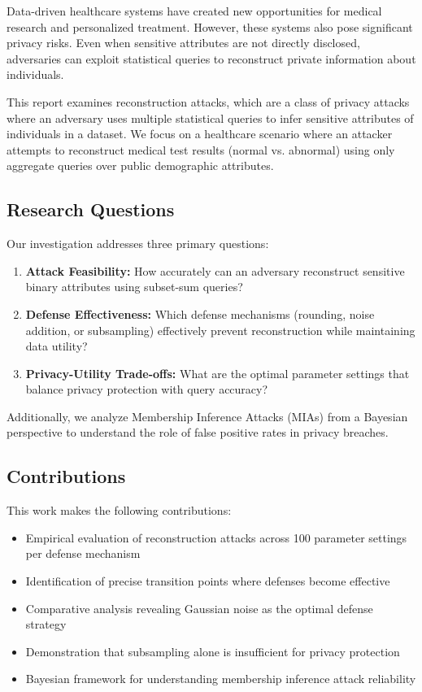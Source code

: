 \documentclass[11pt,letterpaper]{article}
\begin{document}
Data-driven healthcare systems have created new opportunities for medical research and personalized treatment. However, these systems also pose significant privacy risks. Even when sensitive attributes are not directly disclosed, adversaries can exploit statistical queries to reconstruct private information about individuals.

This report examines reconstruction attacks, which are a class of privacy attacks where an adversary uses multiple statistical queries to infer sensitive attributes of individuals in a dataset. We focus on a healthcare scenario where an attacker attempts to reconstruct medical test results (normal vs. abnormal) using only aggregate queries over public demographic attributes.

\subsection{Research Questions}

Our investigation addresses three primary questions:

\begin{enumerate}[leftmargin=*]
    \item \textbf{Attack Feasibility:} How accurately can an adversary reconstruct sensitive binary attributes using subset-sum queries?
    \item \textbf{Defense Effectiveness:} Which defense mechanisms (rounding, noise addition, or subsampling) effectively prevent reconstruction while maintaining data utility?
    \item \textbf{Privacy-Utility Trade-offs:} What are the optimal parameter settings that balance privacy protection with query accuracy?
\end{enumerate}

Additionally, we analyze Membership Inference Attacks (MIAs) from a Bayesian perspective to understand the role of false positive rates in privacy breaches.

\subsection{Contributions}

This work makes the following contributions:

\begin{itemize}[leftmargin=*]
    \item Empirical evaluation of reconstruction attacks across 100 parameter settings per defense mechanism
    \item Identification of precise transition points where defenses become effective
    \item Comparative analysis revealing Gaussian noise as the optimal defense strategy
    \item Demonstration that subsampling alone is insufficient for privacy protection
    \item Bayesian framework for understanding membership inference attack reliability
\end{itemize}
\end{document}
